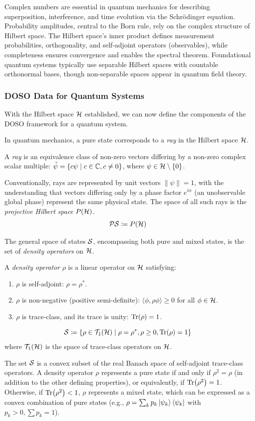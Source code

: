 Complex numbers are essential in quantum mechanics for describing superposition, interference, and time evolution via the Schrödinger equation. Probability amplitudes, central to the Born rule, rely on the complex structure of Hilbert space. The Hilbert space's inner product defines measurement probabilities, orthogonality, and self-adjoint operators (observables), while completeness ensures convergence and enables the spectral theorem. Foundational quantum systems typically use separable Hilbert spaces with countable orthonormal bases, though non-separable spaces appear in quantum field theory.

\subsubsection{DOSO Data for Quantum Systems}

With the Hilbert space $\mathcal{H}$ established, we can now define the components of the DOSO framework for a quantum system.

In quantum mechanics, a pure state corresponds to a \emph{ray} in the Hilbert space $\mathcal{H}$.
\begin{definition}
     A \textit{ray} is an equivalence class of non-zero vectors differing by a non-zero complex scalar multiple: $\tilde{\psi} = \{c\psi \mid c \in \mathbb{C}, c \neq 0\}$, where $\psi \in \mathcal{H} \setminus \{0\}$. 
\end{definition}
Conventionally, rays are represented by unit vectors $\|\psi\|=1$, with the understanding that vectors differing only by a phase factor $e^{i\alpha}$ (an unobservable global phase) represent the same physical state.
The space of all such rays is the \textit{projective Hilbert space} $P(\mathcal{H})$.
\[ \mathcal{PS} \coloneqq P(\mathcal{H}) \]

The general space of states $\mathcal{S}$, encompassing both pure and mixed states, is the set of \textit{density operators} on $\mathcal{H}$. 
\begin{definition}
    A \textit{density operator} $\rho$ is a linear operator on $\mathcal{H}$ satisfying:
\begin{enumerate}
\item $\rho$ is self-adjoint: $\rho = \rho^*$.
\item $\rho$ is non-negative (positive semi-definite): $\langle\phi, \rho\phi\rangle \ge 0$ for all $\phi \in \mathcal{H}$.
\item $\rho$ is trace-class, and its trace is unity: $\Tr(\rho) = 1$.
\end{enumerate}
\[ \mathcal{S} \coloneqq \{ \rho \in \mathcal{T}_1(\mathcal{H}) \mid \rho = \rho^*, \rho \ge 0, \Tr(\rho)=1 \} \]
where $\mathcal{T}_1(\mathcal{H})$ is the space of trace-class operators on $\mathcal{H}$.
\end{definition}
The set $\mathcal{S}$ is a convex subset of the real Banach space of self-adjoint trace-class operators. A density operator $\rho$ represents a pure state if and only if $\rho^2 = \rho$ (in addition to the other defining properties), or equivalently, if $\Tr(\rho^2) = 1$. Otherwise, if $\Tr(\rho^2) < 1$, $\rho$ represents a mixed state, which can be expressed as a convex combination of pure states (e.g., $\rho = \sum_k p_k \ket{\psi_k}\bra{\psi_k}$ with $p_k > 0, \sum p_k = 1$).

